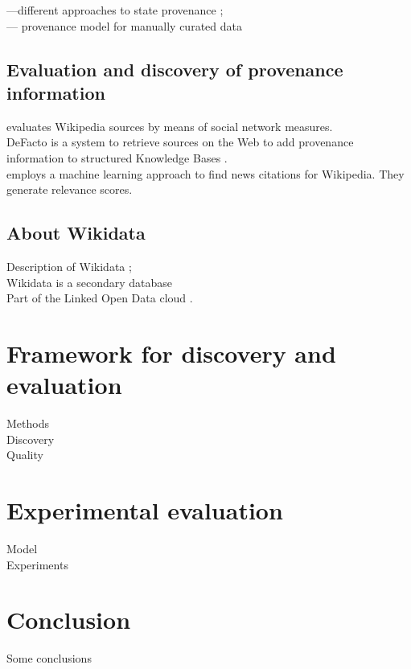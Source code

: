\documentclass{llncs}
\begin{document}
---different approaches to state provenance \cite{DBLP:conf/btw/GlavicD07};\\
--- provenance model for manually curated data \cite{DBLP:conf/ipaw/BunemanCCV06}

\subsection{Evaluation and discovery of provenance information}
\cite{DBLP:journals/oir/KorfiatisPB06} evaluates Wikipedia sources by means of social network measures.\\
DeFacto is a system to retrieve sources on the Web to add provenance information to structured Knowledge Bases \cite{DBLP:conf/semweb/LehmannGMN12}.\\
\cite{DBLP:conf/cikm/FetahuMNA16} employs a machine learning approach to find news citations for Wikipedia. They generate relevance scores.

\subsection{About Wikidata}
Description of Wikidata \cite{DBLP:journals/cacm/VrandecicK14};\\
Wikidata is a secondary database\\
Part of the Linked Open Data cloud \cite{DBLP:conf/semweb/ErxlebenGKMV14}.

\section{Framework for discovery and evaluation}
Methods\\
Discovery\\
    Quality
    
\section{Experimental evaluation}
    Model\\
    Experiments
    
\section{Conclusion}
Some conclusions

%
%
\nocite{*}


\end{document}
